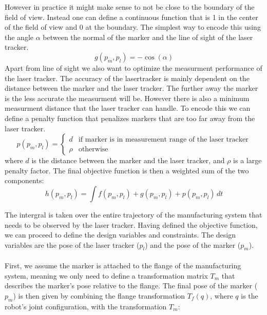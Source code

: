 \documentclass{svproc}
\begin{document}
However in practice it might make sense to not be close to the boundary of the field of view.
Instead one can define a continuous function that is 1 in the center of the field of view and 0 at the boundary.
The simplest way to encode this using the angle $\alpha$ between the normal of the marker and the line of sight of the laser tracker.
\begin{equation}
    g(p_m,p_l) = -\cos(\alpha)
\end{equation}
Apart from line of sight we also want to optimize the measurment performance of the laser tracker.
The accuracy of the lasertracker is mainly dependent on the distance between the marker and the laser tracker.
The further away the marker is the less accurate the measurment will be. However there is also a minimum measurment distance that the laser tracker can handle.
To encode this we can define a penalty function that penalizes markers that are too far away from the laser tracker.
\begin{equation}
    p(p_m,p_l) =  \begin{cases}
        d & \text{if marker is in measurement range of the laser tracker} \\
        \rho & \text{otherwise}
    \end{cases}
\end{equation}
where $d$ is the distance between the marker and the laser tracker, and $\rho$ is a large penalty factor.
The final objective function is then a weighted sum of the two components:
\begin{equation}
    h(p_m,p_l) = \int f(p_m,p_l) +  g(p_m,p_l) + p(p_m,p_l) \, dt
    \label{eq:objective}
\end{equation}

The intergral is taken over the entire trajectory of the manufacturing system that needs to be observed by the laser tracker.
Having defined the objective function, we can proceed to define the design variables and constraints.
The design variables are the pose of the laser tracker ($p_l$) and the pose of the marker ($p_m$).\\
\\
First, we assume the marker is attached to the flange of the manufacturing system, meaning we only need to define a transformation matrix $T_{m}$ that describes the marker's pose relative to the flange.
The final pose of the marker ($p_m$) is then given by combining the flange transformation $T_{f}(q)$, where $q$ is the robot's joint configuration, with the transformation $T_{m}$:
\end{document}
